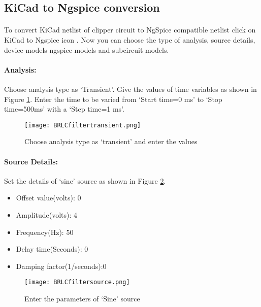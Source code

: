 \subsection*{KiCad to Ngspice conversion}

\paragraph{} To convert KiCad netlist of clipper circuit to NgSpice
compatible netlist click on KiCad to Ngspice icon .  Now you can choose the type of analysis, source details, device models ngspice models and subcircuit models.


%

\paragraph{Analysis:}Choose analysis type as `Transient'. Give the values of time variables as shown in Figure \ref{HRLCfiltertransient}. Enter the time to be varied from `Start time=0 ms' to `Stop time=500ms' with a `Step time=1 ms'.

\begin{figure}[h]
\centering
\texttt{[image: BRLCfiltertransient.png]}
\caption{Choose analysis type as `transient' and enter the values}
\label{HRLCfiltertransient}
\end{figure}

\paragraph{Source Details:} Set the details of `sine' source as shown in Figure \ref{HRLCfiltersource}.
\begin{itemize}
\item
Offset value(volts): 0
\item
Amplitude(volts): 4
\item
Frequency(Hz): 50
\item
Delay time(Seconds): 0
\item
Damping factor(1/seconds):0

\end{itemize}
\begin{figure}[h]
\centering
\texttt{[image: BRLCfiltersource.png]}
\caption{Enter the parameters of `Sine' source}
\label{HRLCfiltersource}
\end{figure}


